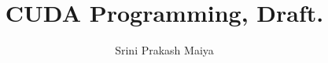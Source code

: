 \documentclass[14pt]{report}
\title{CUDA Programming, Draft.}
\author{Srini Prakash Maiya}
\begin{document}
\maketitle
\pagebreak
\tableofcontents
\pagebreak






\end{document}

